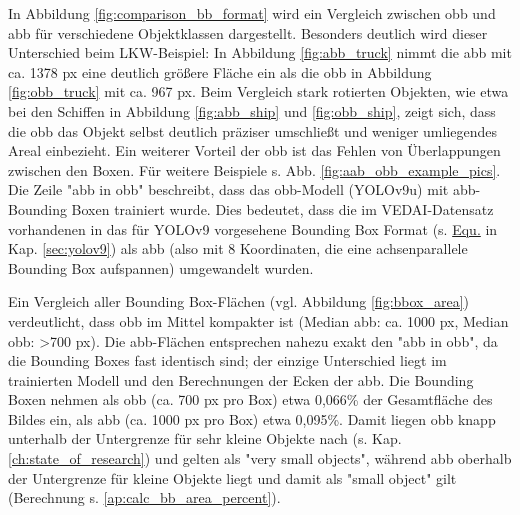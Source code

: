 In Abbildung \ref{fig:comparison_bb_format} wird ein Vergleich zwischen \acrshort{obb} und \acrshort{abb} für verschiedene Objektklassen dargestellt. Besonders deutlich wird dieser Unterschied beim LKW-Beispiel: In Abbildung \ref{fig:abb_truck} nimmt die \acrshort{abb} mit ca. 1378 px eine deutlich größere Fläche ein als die \acrshort{obb} in Abbildung \ref{fig:obb_truck} mit ca. 967 px. Beim Vergleich stark rotierten Objekten, wie etwa bei den Schiffen in Abbildung \ref{fig:abb_ship} und \ref{fig:obb_ship}, zeigt sich, dass die \acrshort{obb} das Objekt selbst deutlich präziser umschließt und weniger umliegendes Areal einbezieht. Ein weiterer Vorteil der \acrshort{obb} ist das Fehlen von Überlappungen zwischen den Boxen. Für weitere Beispiele s. Abb. \ref{fig:aab_obb_example_pics}. Die Zeile "abb in obb" beschreibt, dass das \acrshort{obb}-Modell (\acrshort{YOLO}v9u) mit \acrshort{abb}-Bounding Boxen trainiert wurde. Dies bedeutet, dass die im \acrshort{VEDAI}-Datensatz vorhandenen  in das für \acrshort{YOLO}v9 vorgesehene Bounding Box Format (s. \hyperlink{eq:yolov9u}{Equ.} in Kap. \ref{sec:yolov9}) als \acrshort{abb} (also mit 8 Koordinaten, die eine achsenparallele Bounding Box aufspannen) umgewandelt wurden. 

Ein Vergleich aller Bounding Box-Flächen (vgl. Abbildung \ref{fig:bbox_area}) verdeutlicht, dass \acrshort{obb} im Mittel kompakter ist (Median \acrshort{abb}: ca. 1000 px, Median \acrshort{obb}: >700 px). Die \acrshort{abb}-Flächen entsprechen nahezu exakt den "abb in obb", da die Bounding Boxes fast identisch sind; der einzige Unterschied liegt im trainierten Modell und den Berechnungen der Ecken der \acrshort{abb}. Die Bounding Boxen nehmen  als \acrshort{obb} (ca. 700 px pro Box) etwa 0,066\% der Gesamtfläche des Bildes ein, als \acrshort{abb} (ca. 1000 px pro Box) etwa 0,095\%. Damit liegen \acrshort{obb} knapp unterhalb der Untergrenze für sehr kleine Objekte nach \citeauthor{Chen2017} \cite{Chen2017} (s. Kap. \ref{ch:state_of_research}) und gelten als "very small objects", während \acrshort{abb} oberhalb der Untergrenze für kleine Objekte liegt und damit als "small object" gilt (Berechnung s. \ref{ap:calc_bb_area_percent}).


